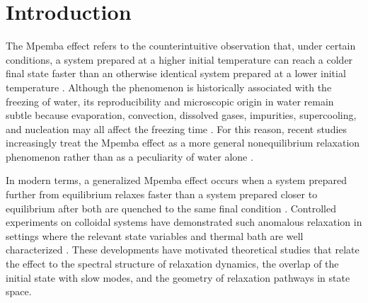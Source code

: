 ﻿\documentclass[aps,pre,preprint,showkeys,amsmath,amssymb,superscriptaddress,longbibliography]{revtex4-2}
\begin{document}
\section{Introduction}\label{introduction}

The Mpemba effect refers to the counterintuitive observation that, under certain conditions, a system prepared at a higher initial temperature can reach a colder final state faster than an otherwise identical system prepared at a lower initial temperature \cite{Mpemba1969}. Although the phenomenon is historically associated with the freezing of water, its reproducibility and microscopic origin in water remain subtle because evaporation, convection, dissolved gases, impurities, supercooling, and nucleation may all affect the freezing time \cite{Jeng2006,Auerbach1995,Burridge2016}. For this reason, recent studies increasingly treat the Mpemba effect as a more general nonequilibrium relaxation phenomenon rather than as a peculiarity of water alone \cite{Bechhoefer2021}.

In modern terms, a generalized Mpemba effect occurs when a system prepared further from equilibrium relaxes faster than a system prepared closer to equilibrium after both are quenched to the same final condition \cite{LuRaz2017,Klich2019}. Controlled experiments on colloidal systems have demonstrated such anomalous relaxation in settings where the relevant state variables and thermal bath are well characterized \cite{Kumar2020}. These developments have motivated theoretical studies that relate the effect to the spectral structure of relaxation dynamics, the overlap of the initial state with slow modes, and the geometry of relaxation pathways in state space.
\end{document}
